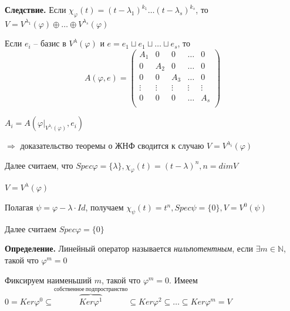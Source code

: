 \vspace{\baselineskip}
\textbf{Следствие.} Если $\chi_{\varphi} (t) = (t - \lambda_1)^{k_1} \dots (t - \lambda_s)^{k_s}$, то $V = V^{\lambda_1} (\varphi) \oplus \dots \oplus V^{\lambda_s} (\varphi)$

\vspace{\baselineskip}
Если $e_i$ -- базис в $V^{\lambda} (\varphi)$ и $e = e_1 \sqcup e_1 \sqcup \dots \sqcup e_s$, то \begin{equation*}A(\varphi, e) = \left(
\begin{array}{c|c|c|c|c}
  A_1 & 0 & 0 & \dots & 0  \\
  \hline
  0 & A_2 & 0 & \dots & 0  \\
  \hline
  0 & 0 & A_3 & \dots & 0 \\
  \hline
  \vdots & \vdots & \vdots & \vdots & \vdots \\
  \hline
  0 & 0 & 0 & \dots & A_s \\
\end{array}
\right)\end{equation*}

$A_i = A(\varphi|_{V^{\lambda_i} (\varphi)}, e_i)$

$\Rightarrow$ доказательство теоремы о ЖНФ сводится к случаю $V = V^{\lambda_i} (\varphi)$

Далее считаем, что $Spec \varphi = \{ \lambda\}, \chi_{\varphi} (t) = (t - \lambda)^n, n = dim V$

$V = V^{\lambda} (\varphi)$

Полагая $\psi = \varphi - \lambda \cdot Id$, получаем $\chi_{\psi} (t) = t^n, Spec \psi = \{0\}, V = V^0 (\psi)$

Далее считаем $Spec \varphi = \{0\}$

\vspace{\baselineskip}
\textbf{Определение.} Линейный оператор называется \textit{нильпотентным}, если $\exists m \in \mathbb{N}$, такой что $\varphi^m = 0$

\vspace{\baselineskip}
Фиксируем наименьший $m$, такой что $\varphi^m = 0$. Имеем $0 = Ker \varphi^0 \subseteq \overbrace{Ker \varphi^1}^{собственное \ подпространство} \subseteq Ker \varphi^2 \subseteq \dots \subseteq Ker \varphi^m = V$

